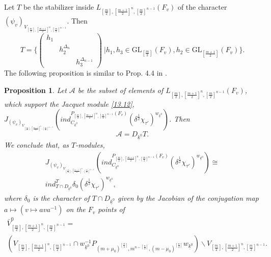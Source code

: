 \documentclass[12pts]{amsart}
\newcommand{\GL}{{\mathrm{GL}}}
\newtheorem{prop}[thm]{Proposition}
\begin{document}
Let $T$ be the stabilizer inside  $L_{[\frac{m}{2}],[\frac{m+1}{2}]^n,[\frac{m}{2}]^{n-1}}(F_v)$ of the character\\
 $(\psi_v)_{V_{[\frac{m}{2}],[\frac{m+1}{2}]^n,[\frac{m}{2}]^{n-1}}}$. Then
$$
T=\{\begin{pmatrix}h_1\\&h_2^{\Delta_n}\\&&h_3^{\Delta_{n-1}}\end{pmatrix}\ |h_1, h_3\in \GL_{[\frac{m}{2}]}(F_v), h_2\in \GL_{[\frac{m+1}{2}]}(F_v) \}.
$$
The following proposition is similar to Prop. 4.4 in \cite{GJS15}.
\begin{prop}\label{prop 13.4}
Let $\mathcal{A}$ be the subset of elements of $L_{[\frac{m}{2}],[\frac{m+1}{2}]^n,[\frac{m}{2}]^{n-1}}(F_v)$,	
which support the Jacquet module \eqref{13.12},\\ $J_{(\psi_v)_{V_{[\frac{m}{2}],[\frac{m+1}{2}]^n,[\frac{m}{2}]^{n-1}}}}(ind^{P_{[\frac{m}{2}],[\frac{m+1}{2}]^n,[\frac{m}{2}]^{n-1}}(F_v)}_{C_{\underline{k}^0}}(\delta^{\frac{1}{2}}\chi_{\tau'})^{w_{\underline{k}^0}})$. Then
$$
\mathcal{A}=D_{\underline{k}^0}T.
$$
We conclude that, as $T$-modules,
\begin{multline}\label{13.16}
J_{(\psi_v)_{V_{[\frac{m}{2}],[\frac{m+1}{2}]^n,[\frac{m}{2}]^{n-1}}}}(ind^{P_{[\frac{m}{2}],[\frac{m+1}{2}]^n,[\frac{m}{2}]^{n-1}}(F_v)}_{C_{\underline{k}^0}}(\delta^{\frac{1}{2}}\chi_{\tau'})^{w_{\underline{k}^0}})\cong\\
 ind_{T\cap D_{\underline{k}^0}}^T\delta_0(\delta^{\frac{1}{2}}\chi_{\tau'})^{w_{\underline{k}^0}},
\end{multline}
where $\delta_0$ is the character of $T\cap D_{\underline{k}^0}$ given by the Jacobian of the conjugation map $a\mapsto (v\mapsto ava^{-1})$ on the $F_v$ points of
\begin{multline}\nonumber
\bar{V}_{[\frac{m}{2}],[\frac{m+1}{2}]^n,[\frac{m}{2}]^{n-1}}^0=\\
(V_{[\frac{m}{2}],[\frac{m+1}{2}]^n,[\frac{m}{2}]^{n-1}}\cap w^{-1}_{\underline{k}^0}P_{(m+\mu_0)^{[\frac{n}{2}]},m^{n-[\frac{n}{2}]}, (m-\mu_0)^{[\frac{n}{2}]}}w_{\underline{k}^0})\backslash V_{[\frac{m}{2}],[\frac{m+1}{2}]^n,[\frac{m}{2}]^{n-1}}.
\end{multline} 
\end{prop}
\end{document}
